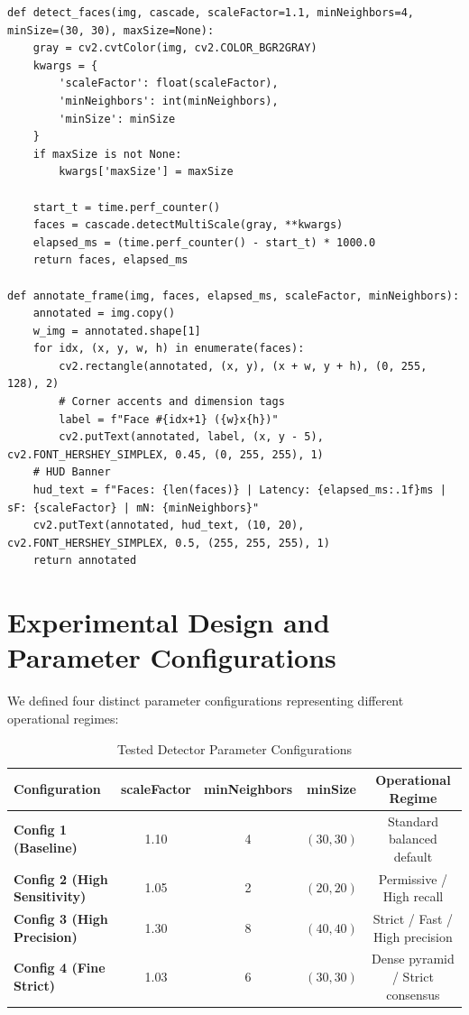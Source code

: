 \documentclass[12pt]{article}
\begin{document}
\begin{lstlisting}[caption={Key segments of the enhanced face detection engine (main\_improved.py)}]
def detect_faces(img, cascade, scaleFactor=1.1, minNeighbors=4, minSize=(30, 30), maxSize=None):
    gray = cv2.cvtColor(img, cv2.COLOR_BGR2GRAY)
    kwargs = {
        'scaleFactor': float(scaleFactor),
        'minNeighbors': int(minNeighbors),
        'minSize': minSize
    }
    if maxSize is not None:
        kwargs['maxSize'] = maxSize
        
    start_t = time.perf_counter()
    faces = cascade.detectMultiScale(gray, **kwargs)
    elapsed_ms = (time.perf_counter() - start_t) * 1000.0
    return faces, elapsed_ms

def annotate_frame(img, faces, elapsed_ms, scaleFactor, minNeighbors):
    annotated = img.copy()
    w_img = annotated.shape[1]
    for idx, (x, y, w, h) in enumerate(faces):
        cv2.rectangle(annotated, (x, y), (x + w, y + h), (0, 255, 128), 2)
        # Corner accents and dimension tags
        label = f"Face #{idx+1} ({w}x{h})"
        cv2.putText(annotated, label, (x, y - 5), cv2.FONT_HERSHEY_SIMPLEX, 0.45, (0, 255, 255), 1)
    # HUD Banner
    hud_text = f"Faces: {len(faces)} | Latency: {elapsed_ms:.1f}ms | sF: {scaleFactor} | mN: {minNeighbors}"
    cv2.putText(annotated, hud_text, (10, 20), cv2.FONT_HERSHEY_SIMPLEX, 0.5, (255, 255, 255), 1)
    return annotated
\end{lstlisting}

\section{Experimental Design and Parameter Configurations}

We defined four distinct parameter configurations representing different operational regimes:

\begin{table}[H]
\centering
\caption{Tested Detector Parameter Configurations}
\begin{tabular}{@{}lcccc@{}}
\toprule
\textbf{Configuration} & \textbf{scaleFactor} & \textbf{minNeighbors} & \textbf{minSize} & \textbf{Operational Regime} \\
\midrule
\textbf{Config 1 (Baseline)} & 1.10 & 4 & $(30, 30)$ & Standard balanced default \\
\textbf{Config 2 (High Sensitivity)} & 1.05 & 2 & $(20, 20)$ & Permissive / High recall \\
\textbf{Config 3 (High Precision)} & 1.30 & 8 & $(40, 40)$ & Strict / Fast / High precision \\
\textbf{Config 4 (Fine Strict)} & 1.03 & 6 & $(30, 30)$ & Dense pyramid / Strict consensus \\
\bottomrule
\end{tabular}
\end{table}
\end{document}
